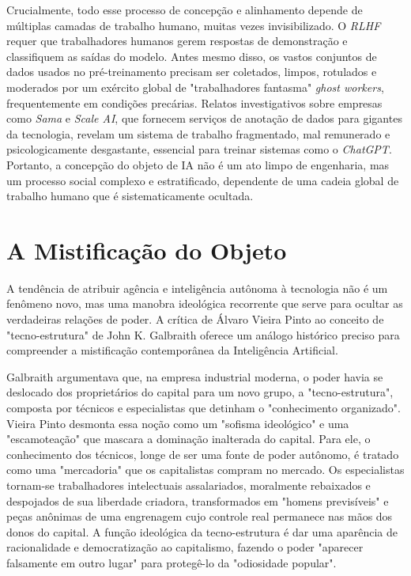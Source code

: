 Crucialmente, todo esse processo de concepção e alinhamento depende de múltiplas camadas de trabalho humano, muitas vezes invisibilizado. O \textit{RLHF} requer que trabalhadores 
humanos gerem respostas de demonstração e classifiquem as saídas do modelo. Antes mesmo disso, os vastos conjuntos de dados usados no pré-treinamento precisam ser coletados, 
limpos, rotulados e moderados por um exército global de "trabalhadores fantasma" \textit{ghost workers}, frequentemente em condições precárias. Relatos investigativos sobre empresas 
como \textit{Sama} e \textit{Scale AI}, que fornecem serviços de anotação de dados para gigantes da tecnologia, revelam um sistema de trabalho fragmentado, mal remunerado e 
psicologicamente desgastante, essencial para treinar sistemas como o \textit{ChatGPT}. Portanto, a concepção do objeto de IA não é um ato limpo de engenharia, mas um processo social 
complexo e estratificado, dependente de uma cadeia global de trabalho humano que é sistematicamente ocultada.

\section{A Mistificação do Objeto}\label{sec:mistificacao_obj}

A tendência de atribuir agência e inteligência autônoma à tecnologia não é um fenômeno novo, mas uma manobra ideológica recorrente que serve para ocultar as verdadeiras relações 
de poder. A crítica de Álvaro Vieira Pinto ao conceito de "tecno-estrutura" de John K. Galbraith oferece um análogo histórico preciso para compreender a mistificação 
contemporânea da Inteligência Artificial.   

Galbraith argumentava que, na empresa industrial moderna, o poder havia se deslocado dos proprietários do capital para um novo grupo, a "tecno-estrutura", composta por técnicos 
e especialistas que detinham o "conhecimento organizado". Vieira Pinto desmonta essa noção como um "sofisma ideológico" e uma "escamoteação" que mascara a dominação inalterada 
do capital. Para ele, o conhecimento dos técnicos, longe de ser uma fonte de poder autônomo, é tratado como uma "mercadoria" que os capitalistas compram no mercado. Os 
especialistas tornam-se trabalhadores intelectuais assalariados, moralmente rebaixados e despojados de sua liberdade criadora, transformados em "homens previsíveis" e peças 
anônimas de uma engrenagem cujo controle real permanece nas mãos dos donos do capital. A função ideológica da tecno-estrutura é dar uma aparência de racionalidade e 
democratização ao capitalismo, fazendo o poder "aparecer falsamente em outro lugar" para protegê-lo da "odiosidade popular".   

